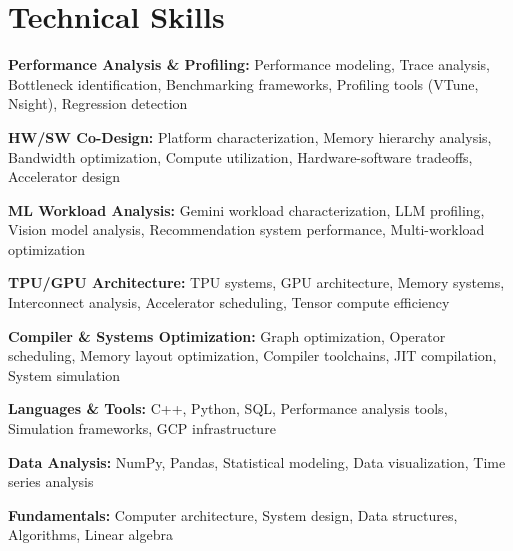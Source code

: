 \documentclass[10pt, letterpaper]{article}
\begin{document}
\section{Technical Skills}
 \begin{itemize}[leftmargin=0.12in, label={}]
    \small{\item{
     \textbf{Performance Analysis \& Profiling:} Performance modeling, Trace analysis, Bottleneck identification, Benchmarking frameworks, Profiling tools (VTune, Nsight), Regression detection
    }}
    \small{\item{
     \textbf{HW/SW Co-Design:} Platform characterization, Memory hierarchy analysis, Bandwidth optimization, Compute utilization, Hardware-software tradeoffs, Accelerator design
    }}
    \small{\item{
     \textbf{ML Workload Analysis:} Gemini workload characterization, LLM profiling, Vision model analysis, Recommendation system performance, Multi-workload optimization
    }}
    \small{\item{
     \textbf{TPU/GPU Architecture:} TPU systems, GPU architecture, Memory systems, Interconnect analysis, Accelerator scheduling, Tensor compute efficiency
    }}
    \small{\item{
     \textbf{Compiler \& Systems Optimization:} Graph optimization, Operator scheduling, Memory layout optimization, Compiler toolchains, JIT compilation, System simulation
    }}
    \small{\item{
     \textbf{Languages \& Tools:} C++, Python, SQL, Performance analysis tools, Simulation frameworks, GCP infrastructure
    }}
    \small{\item{
     \textbf{Data Analysis:} NumPy, Pandas, Statistical modeling, Data visualization, Time series analysis
    }}
    \small{\item{
     \textbf{Fundamentals:} Computer architecture, System design, Data structures, Algorithms, Linear algebra
    }}
 \end{itemize}

\end{document}
